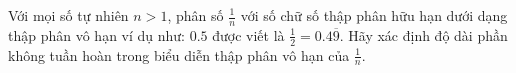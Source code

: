\ifshowproblem
\begin{problem}\label{example:IND-2015-MO-P2}
	Với mọi số tự nhiên \( n > 1 \), phân số \( \frac{1}{n} \) với số chữ số thập phân hữu hạn dưới dạng thập phân vô hạn 
	ví dụ như: \( 0.5 \) được viết là \( \frac{1}{2} = 0.4\overline{9} \).
	Hãy xác định độ dài phần không tuần hoàn trong biểu diễn thập phân vô hạn của \( \frac{1}{n} \).
\end{problem}
\fi

\footnotemark
{}
\fi